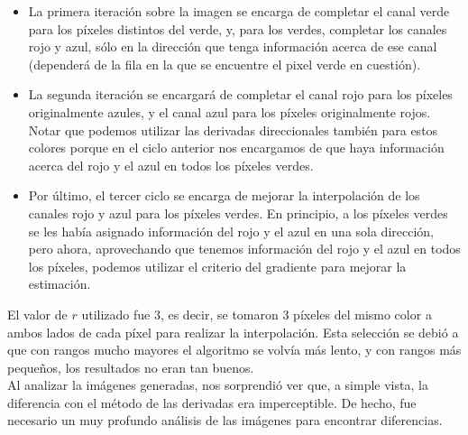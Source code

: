 \documentclass[a4paper]{article}
\begin{document}
\begin{itemize}
\item La primera iteración sobre la imagen se encarga de completar el canal verde para los píxeles distintos del verde, y, para los verdes, completar los canales rojo y azul, sólo en la dirección que tenga información acerca de ese canal (dependerá de la fila en la que se encuentre el pixel verde en cuestión).
\item La segunda iteración se encargará de completar el canal rojo para los píxeles originalmente azules, y el canal azul para los píxeles originalmente rojos. Notar que podemos utilizar las derivadas direccionales también para estos colores porque en el ciclo anterior nos encargamos de que haya información acerca del rojo y el azul en todos los píxeles verdes.
\item Por último, el tercer ciclo se encarga de mejorar la interpolación de los canales rojo y azul para los píxeles verdes. En principio, a los píxeles verdes se les había asignado información del rojo y el azul en una sola dirección, pero ahora, aprovechando que tenemos información del rojo y el azul en todos los píxeles, podemos utilizar el criterio del gradiente para mejorar la estimación.
\end{itemize}

El valor de $r$ utilizado fue 3, es decir, se tomaron 3 píxeles del mismo color a ambos lados de cada píxel para realizar la interpolación. Esta selección se debió a que con rangos mucho mayores el algoritmo se volvía más lento, y con rangos más pequeños, los resultados no eran tan buenos.\\

Al analizar la imágenes generadas, nos sorprendió ver que, a simple vista, la diferencia con el método de las derivadas era imperceptible. De hecho, fue necesario un muy profundo análisis de las imágenes para encontrar diferencias.\\
\end{document}
